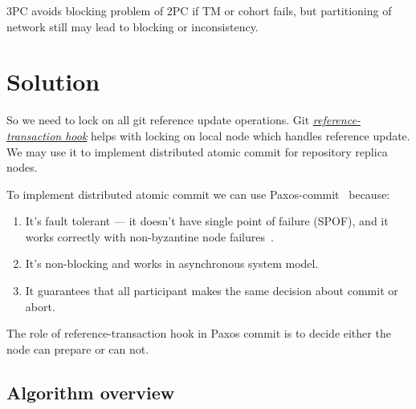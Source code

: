 \documentclass[sigplan, screen, nonacm, 11pt]{acmart}
\begin{document}
3PC avoids blocking problem of 2PC if TM or cohort fails,
but partitioning of network still may lead to blocking or inconsistency.


\section{Solution}

So we need to lock on all git reference update operations.
Git \emph{\href{https://git-scm.com/docs/githooks.html\#\_reference\_transaction}{reference-transaction hook}}
helps with locking on local node which handles reference update. We may use it to implement distributed atomic commit
for repository replica nodes.

To implement distributed atomic commit we can use Paxos-commit~\cite{paxos-commit} because:
\begin{enumerate}
  \item It's fault tolerant --- it doesn't have single point of failure (SPOF), and it works correctly with
    non-byzantine node failures~\cite{byzantine-generals}.
  \item It's non-blocking and works in asynchronous system model.
  \item It guarantees that all participant makes the same decision about commit or abort.
\end{enumerate}

The role of reference-transaction hook in Paxos commit is to decide either the node can prepare or can not.

\subsection{Algorithm overview}
\end{document}
